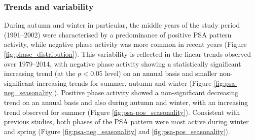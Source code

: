 \subsubsection{Trends and variability}

During autumn and winter in particular, the middle years of the study period (1991--2002) were characterised by a predominance of positive PSA pattern activity, while negative phase activity was more common in recent years (Figure \ref{fig:phase_distribution}). This variability is reflected in the linear trends observed over 1979--2014, with negative phase activity showing a statistically significant increasing trend (at the $p < 0.05$ level) on an annual basis and smaller non-significant increasing trends for summer, autumn and winter (Figure \ref{fig:psa-neg_seasonality}). Positive phase activity showed a non-significant decreasing trend on an annual basis and also during autumn and winter, with an increasing trend observed for summer (Figure \ref{fig:psa-pos_seasonality}). Consistent with previous studies, both phases of the PSA pattern were most active during winter and spring (Figure \ref{fig:psa-neg_seasonality} and \ref{fig:psa-pos_seasonality}). 

